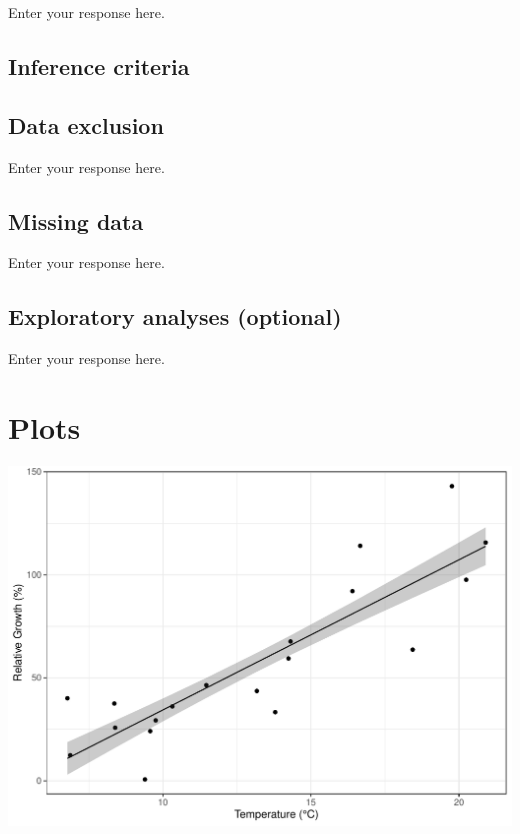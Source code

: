 \documentclass[]{article}
\begin{document}
Enter your response here.

\hypertarget{inference-criteria}{%
\subsection{Inference criteria}\label{inference-criteria}}

\hypertarget{data-exclusion}{%
\subsection{Data exclusion}\label{data-exclusion}}

Enter your response here.

\hypertarget{missing-data}{%
\subsection{Missing data}\label{missing-data}}

Enter your response here.

\hypertarget{exploratory-analyses-optional}{%
\subsection{Exploratory analyses
(optional)}\label{exploratory-analyses-optional}}

Enter your response here.

\hypertarget{plots}{%
\section{Plots}\label{plots}}

\includegraphics{./figures/growth_with_temp.pdf}
\end{document}
